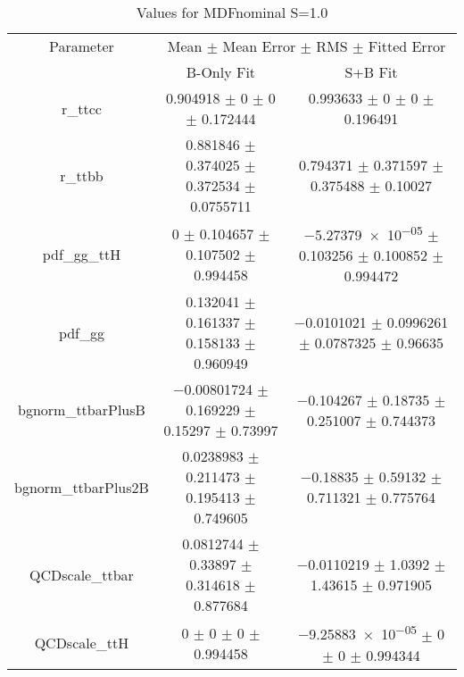 \begin{table}
\centering
\caption{Values for MDFnominal S=1.0}
\begin{tabular}{ccc}
\toprule
Parameter & \multicolumn{2}{c}{Mean $\pm$ Mean Error $\pm$ RMS $\pm$ Fitted Error}\\
 & B-Only Fit & S+B Fit\\
\midrule
r\_ttcc & \num{0.904918} $\pm$ \num{0} $\pm$ \num{0} $\pm$ \num{0.172444} & \num{0.993633} $\pm$ \num{0} $\pm$ \num{0} $\pm$ \num{0.196491}\\
r\_ttbb & \num{0.881846} $\pm$ \num{0.374025} $\pm$ \num{0.372534} $\pm$ \num{0.0755711} & \num{0.794371} $\pm$ \num{0.371597} $\pm$ \num{0.375488} $\pm$ \num{0.10027}\\
pdf\_gg\_ttH & \num{0} $\pm$ \num{0.104657} $\pm$ \num{0.107502} $\pm$ \num{0.994458} & \num{-5.27379e-05} $\pm$ \num{0.103256} $\pm$ \num{0.100852} $\pm$ \num{0.994472}\\
pdf\_gg & \num{0.132041} $\pm$ \num{0.161337} $\pm$ \num{0.158133} $\pm$ \num{0.960949} & \num{-0.0101021} $\pm$ \num{0.0996261} $\pm$ \num{0.0787325} $\pm$ \num{0.96635}\\
bgnorm\_ttbarPlusB & \num{-0.00801724} $\pm$ \num{0.169229} $\pm$ \num{0.15297} $\pm$ \num{0.73997} & \num{-0.104267} $\pm$ \num{0.18735} $\pm$ \num{0.251007} $\pm$ \num{0.744373}\\
bgnorm\_ttbarPlus2B & \num{0.0238983} $\pm$ \num{0.211473} $\pm$ \num{0.195413} $\pm$ \num{0.749605} & \num{-0.18835} $\pm$ \num{0.59132} $\pm$ \num{0.711321} $\pm$ \num{0.775764}\\
QCDscale\_ttbar & \num{0.0812744} $\pm$ \num{0.33897} $\pm$ \num{0.314618} $\pm$ \num{0.877684} & \num{-0.0110219} $\pm$ \num{1.0392} $\pm$ \num{1.43615} $\pm$ \num{0.971905}\\
QCDscale\_ttH & \num{0} $\pm$ \num{0} $\pm$ \num{0} $\pm$ \num{0.994458} & \num{-9.25883e-05} $\pm$ \num{0} $\pm$ \num{0} $\pm$ \num{0.994344}\\
\bottomrule
\end{tabular}
\end{table}